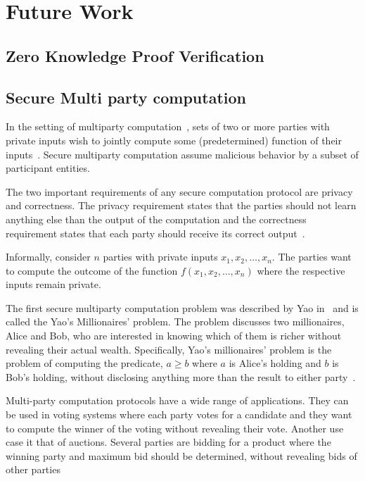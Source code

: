 \chapter{Future Work}
\label{future_work}

\section{Zero Knowledge Proof Verification}
\label{future_work:zkp_ver}

\section{Secure Multi party computation}
\label{future_work:mpc}

In the setting of multiparty computation~\cite{Ben-Or:1988:CTN:62212.62213}, sets of two or more parties with private inputs wish to jointly compute some (predetermined) function of their inputs~\cite{mpc}. Secure multiparty computation assume malicious behavior by a subset of participant entities.

The two important requirements of any secure computation protocol are privacy and correctness. The privacy requirement states that the parties should not learn anything else than the output of the computation and the correctness requirement states that each party should receive its correct output~\cite{mpc}.

Informally, consider $n$ parties with private inputs $x_1, x_2, \dots, x_n$. The parties want to compute the outcome of the function $f(x_1, x_2, \dots, x_n)$ where the respective inputs remain private.

The first secure multiparty computation problem was described by Yao in~\cite{Yao:1982:PSC:1398511.1382751} and is called the Yao's Millionaires' problem. The problem discusses two millionaires, Alice and Bob, who are interested in knowing which of them is richer without revealing their actual wealth. Specifically, Yao’s millionaires’ problem is the problem of computing the predicate, $a \geq b$ where $a$ is Alice's holding and $b$ is Bob's holding, without disclosing anything more than the result to either party~\cite{mpc_ioannidis}.

Multi-party computation protocols have a wide range of applications. They can be used in voting systems where each party votes for a candidate and they want to compute the winner of the voting without revealing their vote. Another use case it that of auctions. Several parties are bidding for a product where the winning party and maximum bid should be determined, without revealing bids of other parties

